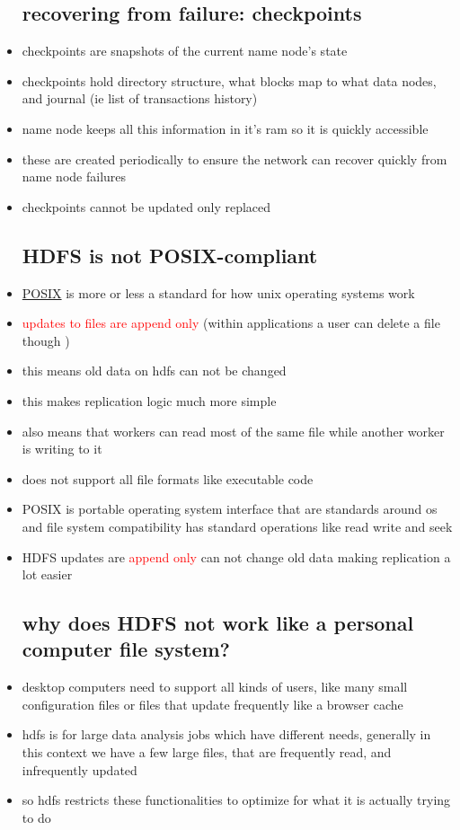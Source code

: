 \documentclass{article}
\begin{document}
\begin{itemize}
\subsection*{recovering from failure: checkpoints}
\item checkpoints are snapshots of the current name node's state 
\item checkpoints hold directory structure, what blocks map to what data nodes, and journal (ie list of transactions history)
\item name node keeps all this information in it's ram so it is quickly accessible 
\item these are created periodically to ensure the network can recover quickly from name node failures
\item checkpoints cannot be updated only replaced 
\subsection*{HDFS is not POSIX-compliant}
\item \href{https://en.wikipedia.org/wiki/POSIX}{POSIX} is more or less a standard for how unix operating systems work 
\item \textcolor{red}{updates to files are append only } (within applications a user can delete a file though )
\item this means old data on hdfs can not be changed 
\item this makes replication logic much more simple
\item also means that workers can read most of the same file while another worker is writing to it 
\item does not support all file formats like executable code
\item POSIX is portable operating system interface that are standards  around os and file system compatibility has standard operations like read write and seek
\item HDFS updates are \textcolor{red}{append only} can not change old data making replication a lot easier 

\subsection*{why does HDFS not work like a personal computer file system?}
\item desktop computers need to support all kinds of users, like many small configuration files or files that update frequently like a browser cache 
\item hdfs is for large data analysis jobs which have different needs, generally in this context we have a few large files, that are frequently read, and infrequently updated
\item so hdfs restricts these functionalities to optimize for what it is actually trying to do 

\end{itemize}
\end{document}
